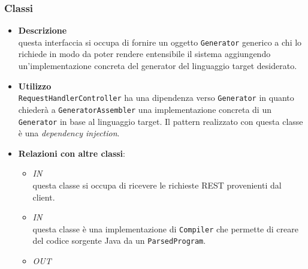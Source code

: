 \subsubsection{Classi}
\label{\nogloxy{swedesigner::server::generator::Generator}}
\begin{figure}[h]
\centering
{}
\caption{}
\end{figure}
\FloatBarrier
\begin{itemize}
\item \textbf{Descrizione}\\
questa interfaccia si occupa di fornire un oggetto \texttt{Generator} generico a chi lo richiede in modo da poter rendere entensibile il sistema aggiungendo un'implementazione concreta del generator del linguaggio target desiderato.
\item \textbf{Utilizzo}\\
\texttt{RequestHandlerController} ha una dipendenza verso \texttt{Generator} in quanto chiederà a \texttt{GeneratorAssembler} una implementazione concreta di un \texttt{Generator} in base al linguaggio target. Il pattern realizzato con questa classe è una \emph{dependency injection}.
\item \textbf{Relazioni con altre classi}:
\begin{itemize}
\item \textit{IN} \hyperref[\nogloxy{swedesigner::server::controller::RequestHandlerController}]{}\\
questa classe si occupa di ricevere le richieste REST provenienti dal client.
\item \textit{IN} \hyperref[\nogloxy{swedesigner::server::generator::java::JavaGenerator}]{}\\
questa classe è una implementazione di \texttt{Compiler} che permette di creare del codice sorgente Java da un \texttt{ParsedProgram}.
\item \textit{OUT} \hyperref[\nogloxy{swedesigner::server::project::ParsedElement}]{}\\

\end{itemize}
\end{itemize}

